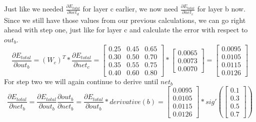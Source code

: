 \documentclass[11pt, halfparskip]{article}
\begin{document}
    \newpage \noindent
    Just like we needed $\frac{\partial E_{total}}{\partial net_d}$ for layer c earlier, we now need $\frac{\partial E_{total}}{\partial net_c}$ for layer b now.\\
    Since we still have those values from our previous calculations, we can go right ahead with step one, just like for layer c and calculate the error with respect to $out_b$.
    \[
  	\frac{\partial E_{total}}{\partial out_b} = (W_c)^T * \frac{\partial E_{total}}{\partial net_c} = 
  	\begin{bmatrix}
            	0.25 & 0.45 & 0.65\\
            	0.30 & 0.50 & 0.70\\
            	0.35 & 0.55 & 0.75\\
            	0.40 & 0.60 & 0.80
            \end{bmatrix}
            *
            \begin{bmatrix}
        		0.0065\\
        		0.0073\\
        		0.0070
        	\end{bmatrix}
        	=
        	\begin{bmatrix}
        		0.0095\\
        		0.0105\\
        		0.0115\\
        		0.0126
        	\end{bmatrix}
    \]
    For step two we will again continue to derive until $net_b$
    \[
    	\frac{\partial E_{total}}{\partial net_b} = \frac{\partial E_{total}}{\partial out_b}\frac{\partial out_b}{\partial net_b} = \frac{\partial E_{total}}{\partial out_b} * derivative(b) =
    	\begin{bmatrix}
        		0.0095\\
        		0.0105\\
        		0.0115\\
        		0.0126
        	\end{bmatrix}
        	*
        	sig'(
        	\begin{bmatrix}
        		0.1\\
        		0.3\\
        		0.5\\
        		0.7
        	\end{bmatrix}
        	)
    \]
\end{document}
